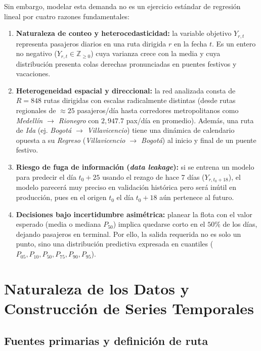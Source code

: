 \documentclass[11pt,a4paper]{article}
\begin{document}
Sin embargo, modelar esta demanda no es un ejercicio estándar de regresión lineal por cuatro razones fundamentales:
\begin{enumerate}[leftmargin=1.5em]
    \item \textbf{Naturaleza de conteo y heterocedasticidad:} la variable objetivo $Y_{r,t}$ representa pasajeros diarios en una ruta dirigida $r$ en la fecha $t$. Es un entero no negativo ($Y_{r,t} \in \mathbb{Z}_{\ge 0}$) cuya varianza crece con la media y cuya distribución presenta colas derechas pronunciadas en puentes festivos y vacaciones.
    \item \textbf{Heterogeneidad espacial y direccional:} la red analizada consta de $R = 848$ rutas dirigidas con escalas radicalmente distintas (desde rutas regionales de $\approx 25$ pasajeros/día hasta corredores metropolitanos como \textit{Medellín $\to$ Rionegro} con $2{,}947.7$ pax/día en promedio). Además, una ruta de \textit{Ida} (ej. \textit{Bogotá $\to$ Villavicencio}) tiene una dinámica de calendario opuesta a su \textit{Regreso} (\textit{Villavicencio $\to$ Bogotá}) al inicio y final de un puente festivo.
    \item \textbf{Riesgo de fuga de información (\textit{data leakage}):} si se entrena un modelo para predecir el día $t_0 + 25$ usando el rezago de hace 7 días ($Y_{r, t_0+18}$), el modelo parecerá muy preciso en validación histórica pero será inútil en producción, pues en el origen $t_0$ el día $t_0+18$ aún pertenece al futuro.
    \item \textbf{Decisiones bajo incertidumbre asimétrica:} planear la flota con el valor esperado (media o mediana $P_{50}$) implica quedarse corto en el $50\%$ de los días, dejando pasajeros en terminal. Por ello, la salida requerida no es solo un punto, sino una distribución predictiva expresada en cuantiles ($P_{05}, P_{10}, P_{50}, P_{75}, P_{90}, P_{95}$).
\end{enumerate}

\section{Naturaleza de los Datos y Construcción de Series Temporales}

\subsection{Fuentes primarias y definición de ruta}
\end{document}
